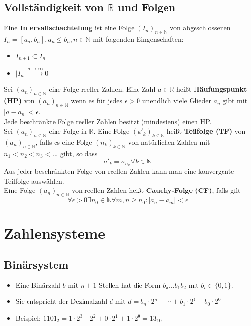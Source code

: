 \documentclass[12pt]{article}
\begin{document}
\subsection{Vollständigkeit von $\mathbb{R}$ und Folgen}
Eine \textbf{Intervallschachtelung} ist eine Folge $(I_n)_{n\in\mathbb{N}}$ von abgeschlossenen $I_n = [a_n, b_n], a_n \leq b_n, n \in \mathbb{N}$ mit folgenden Eingenschaften:
\begin{itemize}
    \item $I_{n+1} \subset I_n$
    \item $|I_n| \xrightarrow{n \to \infty} 0$
\end{itemize}
Sei $(a_n)_{n \in \mathbb{N}}$ eine Folge reeller Zahlen. Eine Zahl $a \in \mathbb{R}$ heißt \textbf{Häufungspunkt (HP)} von $(a_n)_{n \in \mathbb{N}}$ wenn es für jedes $\epsilon > 0$ unendlich viele Glieder $a_n$ gibt mit $|a - a_n| < \epsilon$. \\
Jede beschränkte Folge reeller Zahlen besitzt (mindestens) einen HP. \\
\newline
Sei $(a_n)_{n \in \mathbb{N}}$ eine Folge in $\mathbb{R}$. Eine Folge $(a'_k)_{k \in \mathbb{N}}$ heißt \textbf{Teilfolge (TF)} von $(a_n)_{n \in \mathbb{N}}$, falls es eine Folge $(n_k)_{k \in \mathbb{N}}$ von natürlichen Zahlen mit $n_1 < n_2 < n_3 < \dots$ gibt, so dass
\[a'_k = a_{n_k} \forall k \in \mathbb{N}\]
Aus jeder beschränkten Folge von reellen Zahlen kann man eine konvergente Teilfolge auswählen. \\
\newline
Eine Folge $(a_n)_{n \in \mathbb{N}}$ von reellen Zahlen heißt \textbf{Cauchy-Folge (CF)}, falls gilt
\[\forall \epsilon > 0 \exists n_0 \in \mathbb{N} \forall m,n \geq n_0: |a_n - a_m| < \epsilon\]

\section{Zahlensysteme}
\subsection{Binärsystem}
\begin{itemize}[leftmargin=*]
    \item[] Eine Binärzahl $b$ mit $n + 1$ Stellen hat die Form $b_n\dots b_1 b_2$ mit $b_i \in \{0,1\}$.
    \item[] Sie entspricht der Dezimalzahl $d$ mit $d = b_n \cdot 2^n + \cdots + b_1 \cdot 2^1 + b_0 \cdot 2^0$ 
    \item[] Beispiel: $1101_2 = 1 \cdot 2^3 + ^\cdot 2^2 + 0 \cdot 2^1 + 1 \cdot 2^0 = 13_{10}$
\end{itemize}
\end{document}
